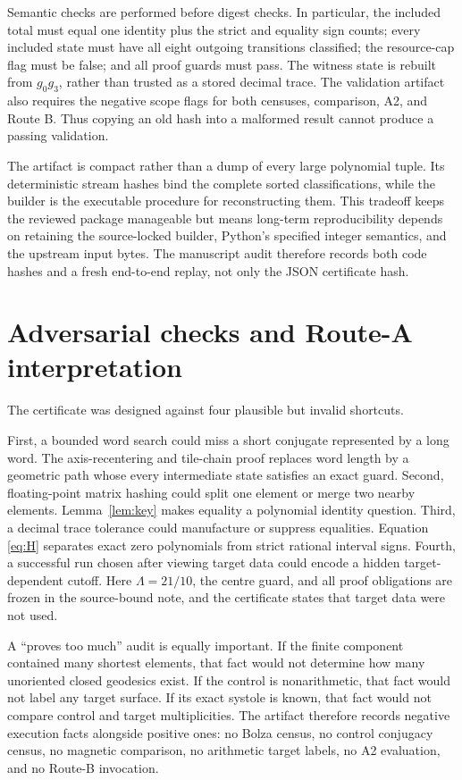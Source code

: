 \documentclass[11pt,a4paper]{article}
\theoremstyle{definition}
\begin{document}
Semantic checks are performed before digest checks.  In particular, the
included total must equal one identity plus the strict and equality sign
counts; every included state must have all eight outgoing transitions
classified; the resource-cap flag must be false; and all proof guards must
pass.  The witness state is rebuilt from \(g_0g_3\), rather than trusted as a
stored decimal trace.  The validation artifact also requires the negative
scope flags for both censuses, comparison, A2, and Route B.  Thus copying an
old hash into a malformed result cannot produce a passing validation.

The artifact is compact rather than a dump of every large polynomial tuple.
Its deterministic stream hashes bind the complete sorted classifications,
while the builder is the executable procedure for reconstructing them.  This
tradeoff keeps the reviewed package manageable but means long-term
reproducibility depends on retaining the source-locked builder, Python's
specified integer semantics, and the upstream input bytes.  The manuscript
audit therefore records both code hashes and a fresh end-to-end replay, not
only the JSON certificate hash.

\section{Adversarial checks and Route-A interpretation}

The certificate was designed against four plausible but invalid shortcuts.

First, a bounded word search could miss a short conjugate represented by a
long word.  The axis-recentering and tile-chain proof replaces word length by
a geometric path whose every intermediate state satisfies an exact guard.
Second, floating-point matrix hashing could split one element or merge two
nearby elements.  Lemma~\ref{lem:key} makes equality a polynomial identity
question.  Third, a decimal trace tolerance could manufacture or suppress
equalities.  Equation \eqref{eq:H} separates exact zero polynomials from
strict rational interval signs.  Fourth, a successful run chosen after
viewing target data could encode a hidden target-dependent cutoff.  Here
\(\Lambda=21/10\), the centre guard, and all proof obligations are frozen in
the source-bound note, and the certificate states that target data were not
used.

A ``proves too much'' audit is equally important.  If the finite component
contained many shortest elements, that fact would not determine how many
unoriented closed geodesics exist.  If the control is nonarithmetic, that fact
would not label any target surface.  If its exact systole is known, that fact
would not compare control and target multiplicities.  The artifact therefore
records negative execution facts alongside positive ones: no Bolza census,
no control conjugacy census, no magnetic comparison, no arithmetic target
labels, no A2 evaluation, and no Route-B invocation.
\end{document}
